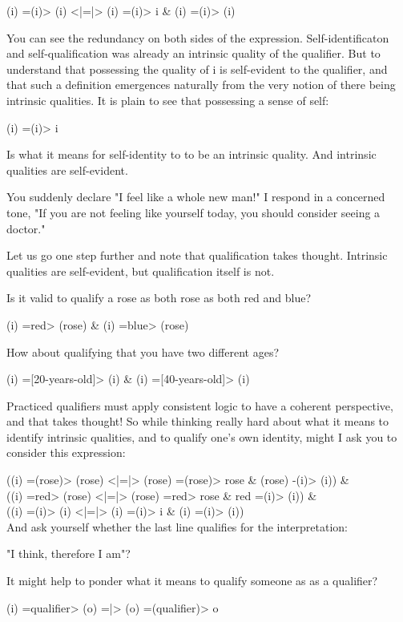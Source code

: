 \documentclass[runningheads]{llncs}
\begin{document}
(i) =(i)> (i) <|=|> (i) =(i)> i \& (i) =(i)> (i)

You can see the redundancy on both sides of the expression. Self-identificaton and self-qualification was already an intrinsic quality of the qualifier. But to understand that possessing the quality of i is self-evident to the qualifier, and that such a definition emergences naturally from the very notion of there being intrinsic qualities. It is plain to see that possessing a sense of self:

(i) =(i)> i

Is what it means for self-identity to to be an intrinsic quality. And intrinsic qualities are self-evident. 

\setcounter{definition}{1}
\begin{example}
	You suddenly declare "I feel like a whole new man!" I respond in a concerned tone, "If you are not feeling like yourself today, you should consider seeing a doctor."
\end{example}

Let us go one step further and note that qualification takes thought. Intrinsic qualities are self-evident, but qualification itself is not. 

Is it valid to qualify a rose as both rose as both red and blue?

(i) =red> (rose) \& (i) =blue> (rose)

How about qualifying that you have two different ages?

(i) =[20-years-old]> (i) \& (i) =[40-years-old]> (i)

Practiced qualifiers must apply consistent logic to have a coherent perspective, and that takes thought! So while thinking really hard about what it means to identify intrinsic qualities, and to qualify one's own identity, might I ask you to consider this expression:

((i) =(rose)> (rose) <|=|> (rose) =(rose)> rose \& (rose) -(i)> (i)) \& \\
((i) =red> (rose) <|=|> (rose) =red> rose \& red =(i)> (i)) \& \\
((i) =(i)> (i) <|=|> (i) =(i)> i \& (i) =(i)> (i)) \\

And ask yourself whether the last line qualifies for the interpretation: 

"I think, therefore I am"?

It might help to ponder what it means to qualify someone as as a qualifier?

(i) =qualifier> (o) =|> (o) =(qualifier)> o
\end{document}
